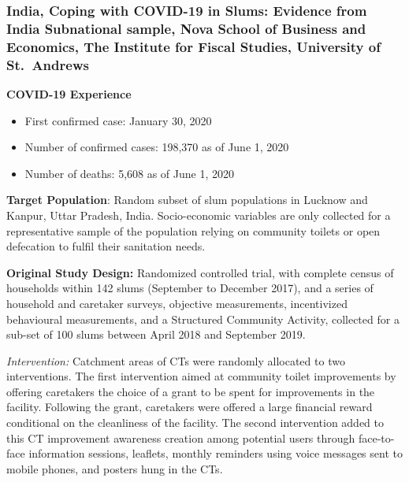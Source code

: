 \documentclass[
  12pt,
]{article}
\begin{document}
\hypertarget{india-coping-with-covid-19-in-slums-evidence-from-india-subnational-sample-nova-school-of-business-and-economics-the-institute-for-fiscal-studies-university-of-st.-andrews}{%
\subsubsection*{India, Coping with COVID-19 in Slums: Evidence from India Subnational sample, Nova School of Business and Economics, The Institute for Fiscal Studies, University of St.~Andrews}\label{india-coping-with-covid-19-in-slums-evidence-from-india-subnational-sample-nova-school-of-business-and-economics-the-institute-for-fiscal-studies-university-of-st.-andrews}}

\textbf{COVID-19 Experience}

\begin{itemize}
\item First confirmed case: January 30, 2020
\item Number of confirmed cases: 198,370 as of June 1, 2020 
\item Number of deaths: 5,608 as of June 1, 2020 
\end{itemize}

\textbf{Target Population}: Random subset of slum populations in Lucknow and Kanpur, Uttar Pradesh, India. Socio-economic variables are only collected for a representative sample of the population relying on community toilets or open defecation to fulfil their sanitation needs.

\textbf{Original Study Design:} Randomized controlled trial, with complete census of households within 142 slums (September to December 2017), and a series of household and caretaker surveys, objective measurements, incentivized behavioural measurements, and a Structured Community Activity, collected for a sub-set of 100 slums between April 2018 and September 2019.

\emph{Intervention:} Catchment areas of CTs were randomly allocated to two interventions. The first intervention aimed at community toilet improvements by offering caretakers the choice of a grant to be spent for improvements in the facility. Following the grant, caretakers were offered a large financial reward conditional on the cleanliness of the facility. The second intervention added to this CT improvement awareness creation among potential users through face-to-face information sessions, leaflets, monthly reminders using voice messages sent to mobile phones, and posters hung in the CTs.
\end{document}
